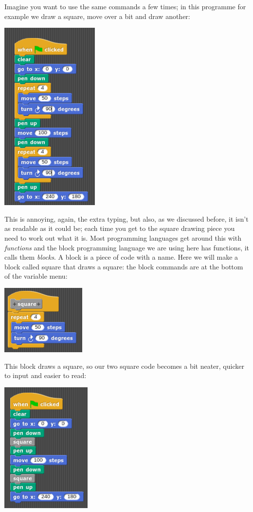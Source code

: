 \documentclass[11pt,a4paper]{scrartcl}
\begin{document}
Imagine you want to use the same commands a few times; in this
programme for example we draw a square, move over a bit and draw
another:
\begin{center}
\includegraphics{two_squares.png}
\end{center}
This is annoying, again, the extra typing, but also, as we discussed
before, it isn't as readable as it could be; each time you get to the
square drawing piece you need to work out what it is. Most programming
languages get around this with \textsl{functions} and the block
programming language we are using here has functions, it calls them
\textsl{blocks}. A block is a piece of code with a name. Here we will
make a block called square that draws a square: the block commands are
at the bottom of the variable menu:
\begin{center}
\includegraphics{two_squares_block_block.png}
\end{center}
This block draws a square, so our two square code becomes a bit
neater, quicker to input and easier to read:
\begin{center}
\includegraphics{two_squares_block.png}
\end{center}
\end{document}
